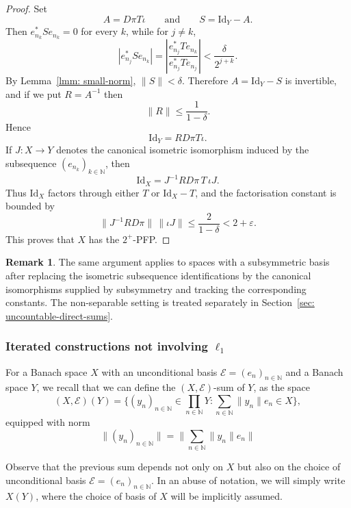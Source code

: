 \documentclass[11pt]{amsart}
\theoremstyle{plain}
\theoremstyle{definition}
\newtheorem{remark}[theorem]{Remark}
\numberwithin{equation}{section}
\newcommand{\norm}[1]{\lVert #1 \rVert}
\newcommand{\N}{\mathbb{N}}
\newcommand{\Id}{\mathrm{Id}}
\renewcommand{\le}{\leqslant}
\begin{document}
\begin{proof}
    Set
    \[
    A=D\pi T\iota
    \qquad\text{and}\qquad
    S=\Id_Y-A.
    \]
    Then $e_{n_k}^*Se_{n_k}=0$ for every $k$, while for $j\neq k$,
    \[
        |e_{n_j}^*Se_{n_k}|=
        \left|\frac{e_{n_j}^*Te_{n_k}}{e_{n_j}^*Te_{n_j}}\right|
        < \frac{\delta}{2^{j+k}}.
    \]
    By Lemma~\ref{lmm: small-norm}, $\norm{S}<\delta$.
    Therefore $A=\Id_Y-S$ is invertible, and if we put $R=A^{-1}$ then
    \[
    \norm{R}\le \frac{1}{1-\delta}.
    \]
    Hence
    \[
    \Id_Y=R D\pi T\iota.
    \]
    If $J\colon X\to Y$ denotes the canonical isometric isomorphism induced by the subsequence $(e_{n_k})_{k \in \N}$, then
    \[
    \Id_X = J^{-1}R D\pi\, T\, \iota J.
    \]
    Thus $\Id_X$ factors through either $T$ or $\Id_X-T$, and the factorisation constant is bounded by
    \[
    \norm{J^{-1}RD\pi}\,\norm{\iota J}
    \le \frac{2}{1-\delta}
    <2+\varepsilon.
    \]
    This proves that $X$ has the $2^+$-PFP.
\end{proof}

\begin{remark}
    The same argument applies to spaces with a subsymmetric basis after replacing the isometric subsequence identifications by the canonical isomorphisms supplied by subsymmetry and tracking the corresponding constants. The non-separable setting is treated separately in Section~\ref{sec: uncountable-direct-sums}.
\end{remark}

\subsubsection{Iterated constructions not involving $\ell_1$}\label{subsec: symmetric-basis-separable-iterated}

For a Banach space $X$ with an unconditional basis $\mathcal{E} = (e_n)_{n \in \N}$ and a Banach space $Y$, we recall that we can define the $(X, \mathcal{E})$-sum of $Y$, as the space
\begin{equation*}
    (X,\mathcal{E})(Y) = \{(y_n)_{n \in \N} \in \prod_{n \in \N} Y: \sum_{n \in \N} \norm{y_n} e_n \in X\},
\end{equation*}
equipped with norm
\begin{equation*}
    \norm{(y_n)_{n \in \N}} = \norm{\sum_{n \in \N} \norm{y_n} e_n}
\end{equation*}

Observe that the previous sum depends not only on $X$ but also on the choice of unconditional basis $\mathcal{E} = (e_n)_{n \in \N}$. In an abuse of notation, we will simply write $X(Y)$, where the choice of basis of $X$ will be implicitly assumed.
\end{document}
